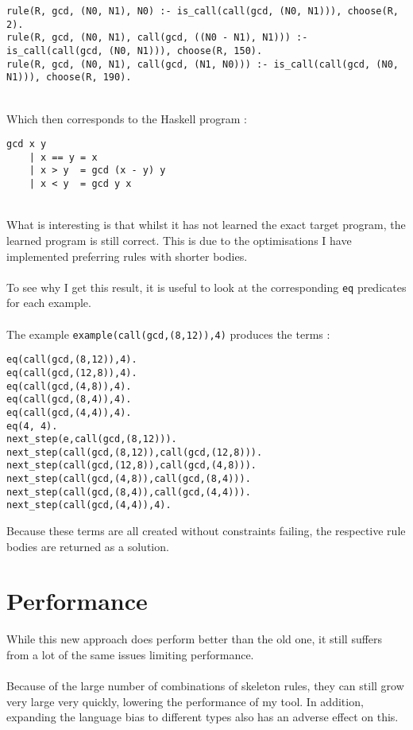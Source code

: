 \begin{lstlisting}
rule(R, gcd, (N0, N1), N0) :- is_call(call(gcd, (N0, N1))), choose(R, 2). 
rule(R, gcd, (N0, N1), call(gcd, ((N0 - N1), N1))) :- is_call(call(gcd, (N0, N1))), choose(R, 150).
rule(R, gcd, (N0, N1), call(gcd, (N1, N0))) :- is_call(call(gcd, (N0, N1))), choose(R, 190).
\end{lstlisting}
\mbox{} \\
Which then corresponds to the Haskell program :

\begin{lstlisting}
gcd x y
	| x == y = x
	| x > y	 = gcd (x - y) y
	| x < y	 = gcd y x
\end{lstlisting}
\mbox{} \\
What is interesting is that whilst it has not learned the exact target program, the learned program is still correct. This is due to the optimisations I have implemented preferring rules with shorter bodies.\\ \\
To see why I get this result, it is useful to look at the corresponding \lstinline{eq} predicates for each example. \\ \\%
The example \lstinline{example(call(gcd,(8,12)),4)} produces the terms :\\ %
\begin{multicols}{2}
\begin{lstlisting}
eq(call(gcd,(8,12)),4). 
eq(call(gcd,(12,8)),4).
eq(call(gcd,(4,8)),4).
eq(call(gcd,(8,4)),4).
eq(call(gcd,(4,4)),4).
eq(4, 4).
next_step(e,call(gcd,(8,12))).
next_step(call(gcd,(8,12)),call(gcd,(12,8))).
next_step(call(gcd,(12,8)),call(gcd,(4,8))).
next_step(call(gcd,(4,8)),call(gcd,(8,4))).
next_step(call(gcd,(8,4)),call(gcd,(4,4))).
next_step(call(gcd,(4,4)),4).
\end{lstlisting}
\end{multicols}

Because these terms are all created without constraints failing, the respective rule bodies are returned as a solution.

\section{Performance}
While this new approach does perform better than the old one, it still suffers from a lot of the same issues limiting performance. \\ \\
Because of the large number of combinations of skeleton rules, they can still grow very large very quickly, lowering the performance of my tool. In addition, expanding the language bias to different types also has an adverse effect on this.

